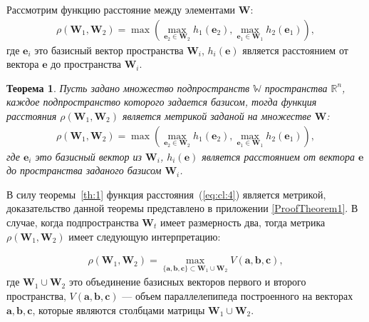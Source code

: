 \documentclass[12pt, twoside]{article}
\newtheorem{theorem}{Теорема}
\numberwithin{equation}{section}
\begin{document}
Рассмотрим функцию расстояние между элементами $\mathbf{W}$:
\begin{equation}
\label{eq:cl:4}
\begin{aligned}
\rho\left(\textbf{W}_1, \textbf{W}_2\right) = \max\left(\max_{\textbf{e}_2 \in \textbf{W}_2} h_{1}\left(\textbf{e}_2\right), \max_{\textbf{e}_1 \in \textbf{W}_1} h_{2}\left(\textbf{e}_1\right)\right),
\end{aligned}
\end{equation}
где  $\textbf{e}_i$ это базисный вектор пространства $\textbf{W}_i$, $h_i\left(\textbf{e}\right)$ является расстоянием от вектора $\textbf{e}$ до пространства $\textbf{W}_i$.

\begin{theorem}
Пусть задано множество подпространств $\mathbb{W}$ пространства $\mathbb{R}^{n}$, каждое подпространство которого задается базисом, тогда функция расстояния $\rho\left(\textbf{W}_1, \textbf{W}_2\right)$ является метрикой заданой на множестве $\mathbf{W}$:
\begin{equation}
\begin{aligned}
\rho\left(\textbf{W}_1, \textbf{W}_2\right) = \max\left(\max_{\textbf{e}_2 \in \textbf{W}_2} h_{1}\left(\textbf{e}_2\right), \max_{\textbf{e}_1 \in \textbf{W}_1} h_{2}\left(\textbf{e}_1\right)\right),
\end{aligned}
\end{equation}
где $\textbf{e}_i$ это базисный вектор из $\textbf{W}_i$, $h_i\left(\textbf{e}\right)$ является расстоянием от вектора $\textbf{e}$ до пространства заданого базисом $\textbf{W}_i$.
\end{theorem}

В силу теоремы~\ref{th:1} функция расстояния~(\ref{eq:cl:4}) является метрикой, доказательство данной теоремы представлено в приложении \ref{ProofTheorem1}. В случае, когда подпространства $\textbf{W}_t$ имеет размерность два, тогда метрика $\rho\left(\textbf{W}_1, \textbf{W}_2\right)$ имеет следующую интерпретацию:

\begin{equation}
\label{eq:cl:5}
\begin{aligned}
\rho\left(\textbf{W}_1, \textbf{W}_2\right) = \max_{\{\textbf{a},\textbf{b},\textbf{c}\} \subset \textbf{W}_1\cup \textbf{W}_2 } V\left(\textbf{a},\textbf{b},\textbf{c}\right), 
\end{aligned}
\end{equation}
где $\textbf{W}_1\cup\textbf{W}_2$ это объединение базисных векторов первого и второго пространства, $V\left(\textbf{a},\textbf{b},\textbf{c}\right)$ --- объем параллелепипеда построенного на векторах $\textbf{a}, \textbf{b}, \textbf{c}$, которые являются столбцами матрицы $\textbf{W}_1\cup\textbf{W}_2$.
\end{document}
